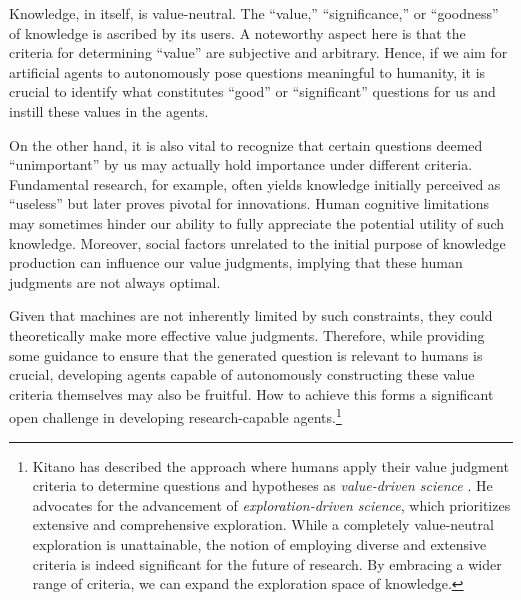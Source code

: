 Knowledge, in itself, is value-neutral. The ``value,'' ``significance,'' or ``goodness'' of knowledge is ascribed by its users. A noteworthy aspect here is that the criteria for determining ``value'' are subjective and arbitrary. Hence, if we aim for artificial agents to autonomously pose questions meaningful to humanity, it is crucial to identify what constitutes ``good'' or ``significant'' questions for us and instill these values in the agents.

On the other hand, it is also vital to recognize that certain questions deemed ``unimportant'' by us may actually hold importance under different criteria. Fundamental research, for example, often yields knowledge initially perceived as ``useless'' but later proves pivotal for innovations. Human cognitive limitations may sometimes hinder our ability to fully appreciate the potential utility of such knowledge. Moreover, social factors unrelated to the initial purpose of knowledge production can influence our value judgments, implying that these human judgments are not always optimal.

Given that machines are not inherently limited by such constraints, they could theoretically make more effective value judgments. Therefore, while providing some guidance to ensure that the generated question is relevant to humans is crucial, developing agents capable of autonomously constructing these value criteria themselves may also be fruitful. How to achieve this forms a significant open challenge in developing research-capable agents.\footnote{
Kitano has described the approach where humans apply their value judgment criteria to determine questions and hypotheses as \textit{value-driven science} \cite{kitano2021nobel}. He advocates for the advancement of \textit{exploration-driven science}, which prioritizes extensive and comprehensive exploration. While a completely value-neutral exploration is unattainable, the notion of employing diverse and extensive criteria is indeed significant for the future of research. By embracing a wider range of criteria, we can expand the exploration space of knowledge.
}


